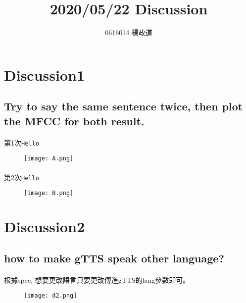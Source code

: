 \title{2020/05/22 Discussion}
\author{0616014 楊政道}
\maketitle
\thispagestyle{fancy}
\section{Discussion1}
\subsection{Try to say the same sentence twice, then plot the MFCC for both result.}
\paragraph{}
第1次\texttt{Hello}
\begin{figure}[!h]
    \begin{center}
        \texttt{[image: A.png]}
    \end{center}
\end{figure}
\paragraph{}
第2次\texttt{Hello}
\begin{figure}[!h]
    \begin{center}
        \texttt{[image: B.png]}
    \end{center}
\end{figure}
\section{Discussion2}
\subsection{how to make gTTS speak other language?}
\paragraph{}
根據spec, 想要更改語言只要更改傳進gTTS的lang參數即可。
\begin{figure}[!h]
    \begin{center}
        \texttt{[image: d2.png]}
    \end{center}
\end{figure}
